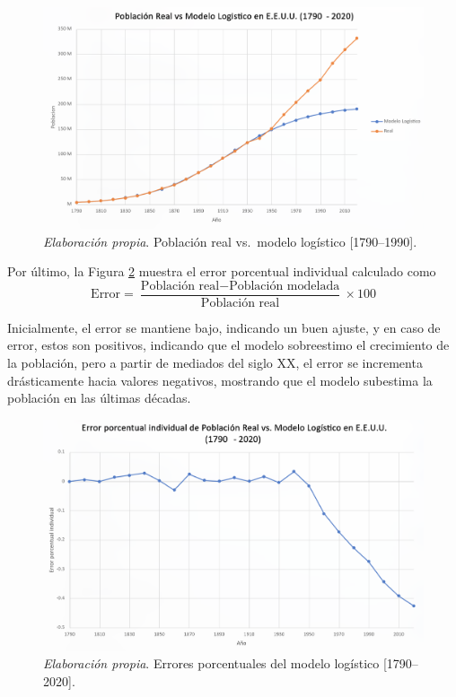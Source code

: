 \documentclass[12pt]{article}
\begin{document}
\begin{figure}[ht]
  \centering
  \includegraphics[width=1\textwidth]{Comparacion3.png}
  \caption{\textit{Elaboración propia}. Población real vs.\ modelo logístico [1790--1990].}
  \label{fig:ajuste}
\end{figure}

\newpage
Por último, la Figura \ref{fig:ajuste2} muestra el error porcentual individual calculado como 
$$
\text{Error} = \frac{\text{Población real} - \text{Población modelada}}{\text{Población real}} \times 100$$

Inicialmente, el error se mantiene bajo, indicando un buen ajuste, y en caso de error, estos son positivos, indicando que el modelo sobreestimo el crecimiento de la población, pero a partir de mediados del siglo XX, el error se incrementa drásticamente hacia valores negativos, mostrando que el modelo subestima la población en las últimas décadas.
 
\begin{figure}[ht]
  \centering
  \includegraphics[width=1\textwidth]{Error3.png}
  \caption{\textit{Elaboración propia}. Errores porcentuales del modelo logístico [1790--2020].}
  \label{fig:ajuste2}
\end{figure}
\end{document}
